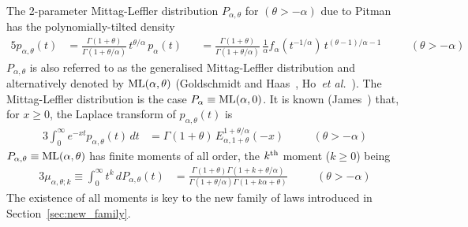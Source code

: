 \documentclass[a4paper,12pt]{article}
\begin{document}
{{%

The 2-parameter Mittag-Leffler  distribution $P_{\alpha,\theta}$ for  $(\theta>-\alpha)$ due to
Pitman~\cite[Theorem~3.8]{Pitman_CSP} has the  polynomially-tilted density
\begin{alignat}{5}
p_{\alpha,\theta}(t) 
&= \frac{\Gamma(1+\theta)}{\Gamma(1+\theta/\alpha)} \, t^{\theta/\alpha}\, p_\alpha(t)
&&=  \frac{\Gamma(1+\theta)}{ \Gamma(1+\theta/\alpha)} \,\frac{1}{\alpha} f_\alpha(t^{-1/\alpha}) \, t^{(\theta-1)/\alpha-1}  \quad && (\theta>-\alpha) 
 \label{eq:ML2par}   
\end{alignat}
$P_{\alpha,\theta}$  is also referred to as the generalised Mittag-Leffler distribution and alternatively 
denoted by ${\rm ML(\alpha,\theta)}$ 
(Goldschmidt and Haas~\cite{GoldschmidtHaas}, Ho~{\it  et al.}~\cite{HoJamesLau}). %
The Mittag-Leffler distribution is the case $P_{\alpha}\equiv{\rm ML}(\alpha,0)$.
It is known (James~\cite{James_Lamperti}) that,  for $x\ge0$, the Laplace transform of $p_{\alpha,\theta}(t)$ is  
\begin{alignat}{3}
\int_0^\infty e^{-x t} p_{\alpha,\theta}(t) \, dt 
&= \Gamma(1+\theta)\, E^{1+\theta/\alpha}_{\alpha,1+\theta}(-x)   \quad && (\theta>-\alpha) 
\label{eq:ML2parLT} 
\end{alignat}
$P_{\alpha,\theta}\equiv {\rm ML(\alpha,\theta)}$  has finite moments of all order, the $k^{\rm th}$ moment  ($k\ge0$) being
\begin{alignat}{3}
\mu_{\alpha,\theta;k} \equiv \int_0^\infty t^k \, dP_{\alpha,\theta}(t)
&= \frac{\Gamma(1+\theta)\Gamma(1+k+\theta/\alpha)}{\Gamma(1+\theta/\alpha)\Gamma(1+k\alpha+\theta)}  \quad && (\theta>-\alpha) 
 \label{eq:ML2parMoment} 
 \end{alignat}
 The existence of all moments  is key to  the new family of laws introduced in Section~\ref{sec:new_family}.

}}
\end{document}
